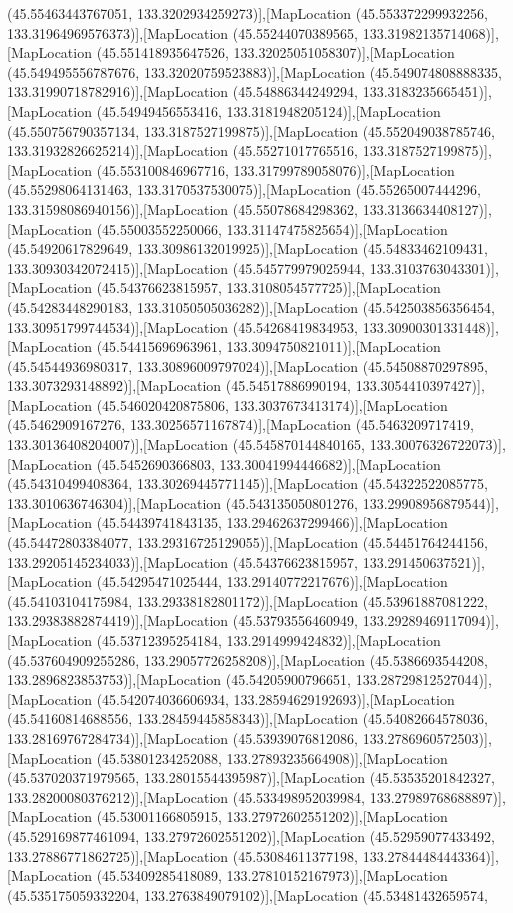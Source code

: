 (45.55463443767051, 133.3202934259273)],[MapLocation (45.553372299932256, 133.31964969576373)],[MapLocation (45.55244070389565, 133.31982135714068)],[MapLocation (45.551418935647526, 133.32025051058307)],[MapLocation (45.549495556787676, 133.32020759523883)],[MapLocation (45.549074808888335, 133.31990718782916)],[MapLocation (45.54886344249294, 133.3183235665451)],[MapLocation (45.54949456553416, 133.3181948205124)],[MapLocation (45.550756790357134, 133.3187527199875)],[MapLocation (45.552049038785746, 133.31932826625214)],[MapLocation (45.55271017765516, 133.3187527199875)],[MapLocation (45.553100846967716, 133.31799789058076)],[MapLocation (45.55298064131463, 133.3170537530075)],[MapLocation (45.55265007444296, 133.31598086940156)],[MapLocation (45.55078684298362, 133.3136634408127)],[MapLocation (45.55003552250066, 133.31147475825654)],[MapLocation (45.54920617829649, 133.30986132019925)],[MapLocation (45.54833462109431, 133.30930342072415)],[MapLocation (45.545779979025944, 133.3103763043301)],[MapLocation (45.54376623815957, 133.3108054577725)],[MapLocation (45.54283448290183, 133.31050505036282)],[MapLocation (45.542503856356454, 133.30951799744534)],[MapLocation (45.54268419834953, 133.30900301331448)],[MapLocation (45.54415696963961, 133.3094750821011)],[MapLocation (45.54544936980317, 133.30896009797024)],[MapLocation (45.54508870297895, 133.3073293148892)],[MapLocation (45.54517886990194, 133.3054410397427)],[MapLocation (45.546020420875806, 133.3037673413174)],[MapLocation (45.5462909167276, 133.30256571167874)],[MapLocation (45.5463209717419, 133.30136408204007)],[MapLocation (45.545870144840165, 133.30076326722073)],[MapLocation (45.5452690366803, 133.30041994446682)],[MapLocation (45.54310499408364, 133.30269445771145)],[MapLocation (45.54322522085775, 133.3010636746304)],[MapLocation (45.543135050801276, 133.29908956879544)],[MapLocation (45.54439741843135, 133.29462637299466)],[MapLocation (45.54472803384077, 133.29316725129055)],[MapLocation (45.54451764244156, 133.29205145234033)],[MapLocation (45.54376623815957, 133.291450637521)],[MapLocation (45.54295471025444, 133.29140772217676)],[MapLocation (45.54103104175984, 133.29338182801172)],[MapLocation (45.53961887081222, 133.29383882874419)],[MapLocation (45.53793556460949, 133.29289469117094)],[MapLocation (45.53712395254184, 133.2914999424832)],[MapLocation (45.537604909255286, 133.29057726258208)],[MapLocation (45.5386693544208, 133.2896823853753)],[MapLocation (45.54205900796651, 133.28729812527044)],[MapLocation (45.542074036606934, 133.28594629192693)],[MapLocation (45.54160814688556, 133.28459445858343)],[MapLocation (45.54082664578036, 133.28169767284734)],[MapLocation (45.53939076812086, 133.2786960572503)],[MapLocation (45.53801234252088, 133.27893235664908)],[MapLocation (45.537020371979565, 133.28015544395987)],[MapLocation (45.53535201842327, 133.28200080376212)],[MapLocation (45.533498952039984, 133.27989768688897)],[MapLocation (45.53001166805915, 133.27972602551202)],[MapLocation (45.529169877461094, 133.27972602551202)],[MapLocation (45.52959077433492, 133.27886771862725)],[MapLocation (45.53084611377198, 133.27844484443364)],[MapLocation (45.53409285418089, 133.27810152167973)],[MapLocation (45.535175059332204, 133.2763849079102)],[MapLocation (45.53481432659574, 